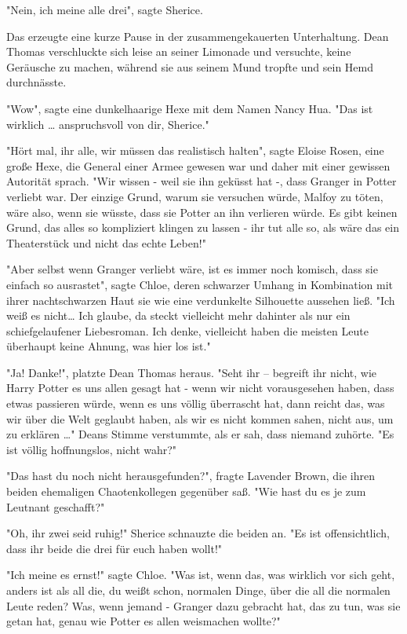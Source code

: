 {"Nein, ich meine alle drei", sagte Sherice.

Das erzeugte eine kurze Pause in der zusammengekauerten Unterhaltung. Dean Thomas verschluckte sich leise an seiner Limonade und versuchte, keine Geräusche zu machen, während sie aus seinem Mund tropfte und sein Hemd durchnässte.

"Wow", sagte eine dunkelhaarige Hexe mit dem Namen Nancy Hua. "Das ist wirklich … anspruchsvoll von dir, Sherice."

"Hört mal, ihr alle, wir müssen das realistisch halten", sagte Eloise Rosen, eine große Hexe, die General einer Armee gewesen war und daher mit einer gewissen Autorität sprach. "Wir wissen - weil sie ihn geküsst hat -, dass Granger in Potter\\ verliebt war. Der einzige Grund, warum sie versuchen würde, Malfoy zu töten, wäre also, wenn sie wüsste, dass sie Potter an ihn verlieren würde. Es gibt keinen Grund, das alles so kompliziert klingen zu lassen - ihr tut alle so, als wäre das ein Theaterstück und nicht das echte Leben!"

"Aber selbst wenn Granger verliebt wäre, ist es immer noch komisch, dass sie einfach so ausrastet", sagte Chloe, deren schwarzer Umhang in Kombination mit ihrer nachtschwarzen Haut sie wie eine verdunkelte Silhouette aussehen ließ. "Ich weiß es nicht… Ich glaube, da steckt vielleicht mehr dahinter als nur ein schiefgelaufener Liebesroman. Ich denke, vielleicht haben die meisten Leute überhaupt keine Ahnung, was hier los ist."

"Ja! Danke!", platzte Dean Thomas heraus. "Seht ihr -- begreift ihr nicht, wie Harry Potter es uns allen gesagt hat - wenn wir nicht vorausgesehen haben, dass etwas passieren würde, wenn es uns völlig überrascht hat, dann reicht das, was wir über die Welt geglaubt haben, als wir es nicht kommen sahen, nicht aus, um zu erklären …" Deans Stimme verstummte, als er sah, dass niemand zuhörte. "Es ist völlig hoffnungslos, nicht wahr?"

"Das hast du noch nicht herausgefunden?", fragte Lavender Brown, die ihren beiden ehemaligen Chaotenkollegen gegenüber saß. "Wie hast du es je zum Leutnant geschafft?"

"Oh, ihr zwei seid ruhig!" Sherice schnauzte die beiden an. "Es ist offensichtlich, dass ihr beide die drei für euch haben wollt!"

"Ich meine es ernst!" sagte Chloe. "Was ist, wenn das, was wirklich vor sich geht, anders ist als all die, du weißt schon, normalen Dinge, über die all die normalen Leute reden? Was, wenn jemand - Granger dazu gebracht hat, das zu tun, was sie getan hat, genau wie Potter es allen weismachen wollte?"

}
